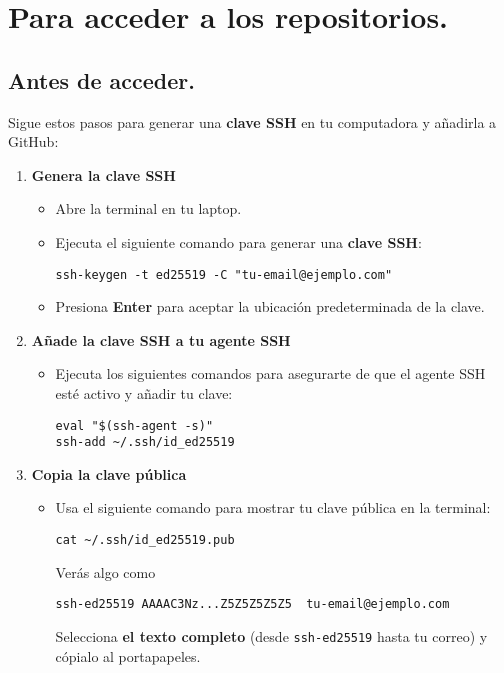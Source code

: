 \documentclass[10pt,a4paper]{book}
\begin{document}
\chapter{Para acceder a los repositorios.}
\newpage
\section{Antes de acceder.}
Sigue estos pasos para generar una \textbf{clave SSH} en tu computadora y añadirla a GitHub:
\begin{enumerate}
	\item \textbf{Genera la clave SSH}
	\begin{itemize}
		\item Abre la terminal en tu laptop.

		\item Ejecuta el siguiente comando para generar una \textbf{clave SSH}: 
		\begin{lstlisting}
ssh-keygen -t ed25519 -C "tu-email@ejemplo.com"
		\end{lstlisting}
		
		\item Presiona \textbf{Enter} para aceptar la ubicación predeterminada de la clave.
	\end{itemize}
	\item \textbf{Añade la clave SSH a tu agente SSH}
	\begin{itemize}
		\item Ejecuta los siguientes comandos para asegurarte de que el agente SSH esté activo y añadir tu clave:
		\begin{lstlisting}
eval "$(ssh-agent -s)"
ssh-add ~/.ssh/id_ed25519
		\end{lstlisting}
	\end{itemize}
	\item \textbf{Copia la clave pública}
	\begin{itemize}
		\item Usa el siguiente comando para mostrar tu clave pública en la terminal:
		\begin{lstlisting}
cat ~/.ssh/id_ed25519.pub
		\end{lstlisting}
		Verás algo como
		\begin{lstlisting}
ssh-ed25519 AAAAC3Nz...Z5Z5Z5Z5Z5  tu-email@ejemplo.com
		\end{lstlisting}
		Selecciona \textbf{el texto completo} (desde  \texttt{ssh-ed25519} hasta tu correo) y cópialo al portapapeles.
	\end{itemize}
	

\end{enumerate}
\end{document}
